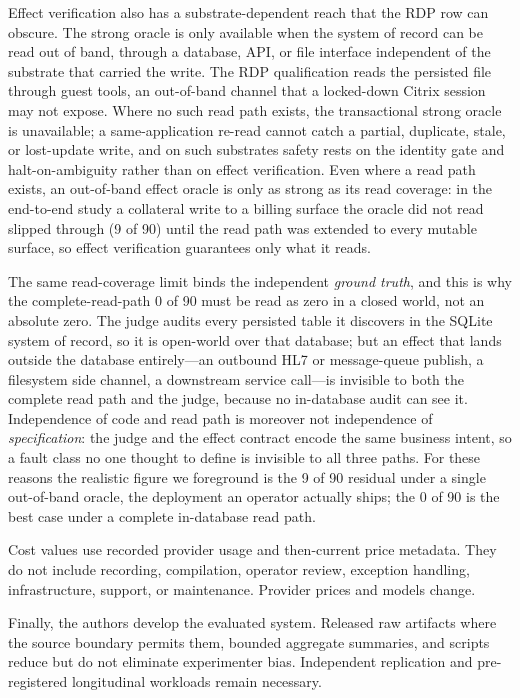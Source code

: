 Effect verification also has a substrate-dependent reach that the RDP row can
obscure. The strong oracle is only available when the system of record can be
read out of band, through a database, API, or file interface independent of the
substrate that carried the write. The RDP qualification reads the persisted file
through guest tools, an out-of-band channel that a locked-down Citrix session may
not expose. Where no such read path exists, the transactional strong oracle is
unavailable; a same-application re-read cannot catch a partial, duplicate, stale,
or lost-update write, and on such substrates safety rests on the identity gate
and halt-on-ambiguity rather than on effect verification. Even where a read path
exists, an out-of-band effect oracle is only as strong as its read coverage: in
the end-to-end study a collateral write to a billing surface the oracle did not
read slipped through (9 of 90) until the read path was extended to every mutable
surface, so effect verification guarantees only what it reads.

The same read-coverage limit binds the independent \emph{ground truth}, and this
is why the complete-read-path 0 of 90 must be read as zero in a closed world, not
an absolute zero. The judge audits every persisted table it discovers in the
SQLite system of record, so it is open-world over that database; but an effect
that lands outside the database entirely---an outbound HL7 or message-queue
publish, a filesystem side channel, a downstream service call---is invisible to
both the complete read path and the judge, because no in-database audit can see
it. Independence of code and read path is moreover not independence of
\emph{specification}: the judge and the effect contract encode the same business
intent, so a fault class no one thought to define is invisible to all three
paths. For these reasons the realistic figure we foreground is the 9 of 90
residual under a single out-of-band oracle, the deployment an operator actually
ships; the 0 of 90 is the best case under a complete in-database read path.

Cost values use recorded provider usage and then-current price metadata. They do
not include recording, compilation, operator review, exception handling,
infrastructure, support, or maintenance. Provider prices and models change.

Finally, the authors develop the evaluated system. Released raw artifacts where
the source boundary permits them, bounded aggregate summaries, and scripts
reduce but do not eliminate experimenter bias. Independent replication and
pre-registered longitudinal workloads remain necessary.

